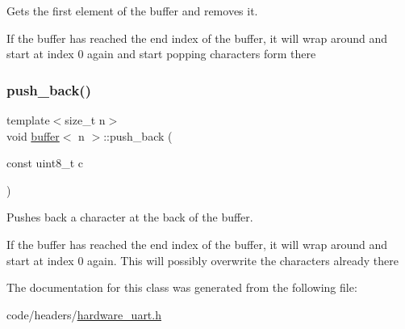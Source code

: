 Gets the first element of the buffer and removes it. 

If the buffer has reached the end index of the buffer, it will wrap around and start at index 0 again and start popping characters form there \mbox{\label{classbuffer_a9a581b60e734970b849182ecc150590f}} 
\subsubsection{\texorpdfstring{push\+\_\+back()}{push\_back()}}
{\footnotesize\ttfamily template$<$size\+\_\+t n$>$ \\
void \hyperlink{classbuffer}{buffer}$<$ n $>$\+::push\+\_\+back (\begin{DoxyParamCaption}\item[{const uint8\+\_\+t}]{c }\end{DoxyParamCaption})\hspace{0.3cm}{\ttfamily [inline]}}



Pushes back a character at the back of the buffer. 

If the buffer has reached the end index of the buffer, it will wrap around and start at index 0 again. This will possibly overwrite the characters already there 

The documentation for this class was generated from the following file\+:\begin{DoxyCompactItemize}
\item 
code/headers/\hyperlink{hardware__uart_8h}{hardware\+\_\+uart.\+h}\end{DoxyCompactItemize}
